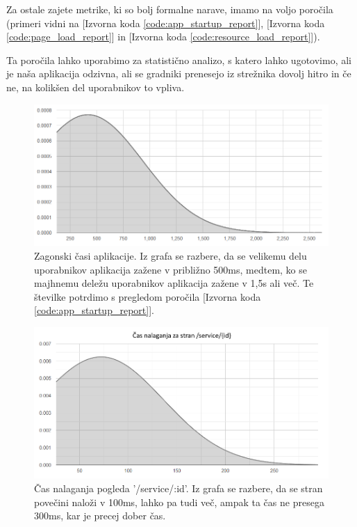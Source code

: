\documentclass[a4paper, 12pt]{book}
\begin{document}
Za ostale zajete metrike, ki so bolj formalne narave, imamo na voljo poročila (primeri vidni na  [Izvorna koda \ref{code:app_startup_report}],  [Izvorna koda \ref{code:page_load_report}] in  [Izvorna koda \ref{code:resource_load_report}]).

Ta poročila lahko uporabimo za statistično analizo, s katero lahko ugotovimo, ali je naša aplikacija odzivna, ali se gradniki prenesejo iz strežnika dovolj hitro in če ne, na kolikšen del uporabnikov to vpliva.

\begin{figure}[h]
	\begin{center}
		\includegraphics[width=1\textwidth]{app_startup_graph.png}
	\end{center}
	\caption{Zagonski časi aplikacije. Iz grafa se razbere, da se velikemu delu uporabnikov aplikacija zažene v približno 500ms, medtem, ko se majhnemu deležu uporabnikov aplikacija zažene v 1,5s ali več. Te številke potrdimo s pregledom poročila [Izvorna koda \ref{code:app_startup_report}].}
	\label{img:graph_app_startup}
\end{figure}

\begin{figure}[h]
	\begin{center}
		\includegraphics[width=1\textwidth]{page_load_graph_service_details.png}
	\end{center}
	\caption{Čas nalaganja pogleda '/service/:id'. Iz grafa se razbere, da se stran povečini naloži v 100ms, lahko pa tudi več, ampak ta čas ne presega 300ms, kar je precej dober čas.}
	\label{img:graph_page_load}
\end{figure}
\end{document}
